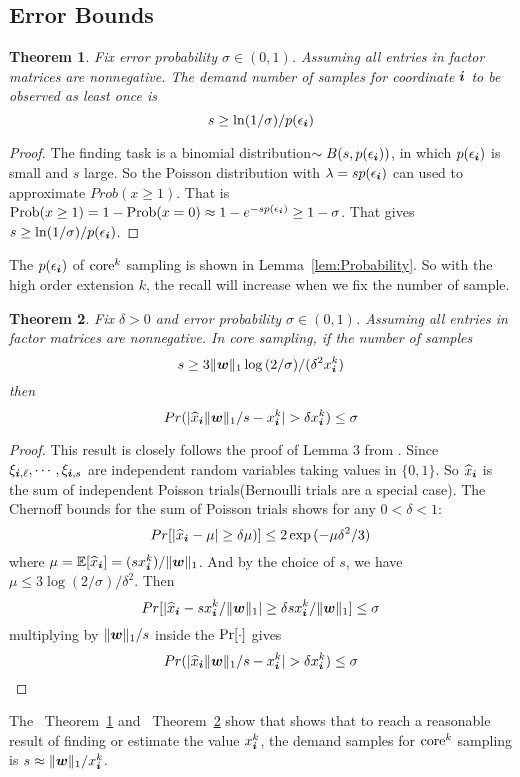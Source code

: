 \documentclass[letterpaper]{article}
\newcommand{\score}[1]{\xi_{\V{i},#1}}
\newcommand{\V}[1]{{\bm{{\MakeLowercase{#1}}}}}
\newcommand{\norm}[2]{\|#1\|_{#2}}
\newcommand{\Lem}[1]  {Lemma~\ref{lem:#1}}
\newcommand{\Theo}[1] {Theorem~\ref{theo:#1}}
\newcommand{\predx}{\widehat{x}_{\V{i}}}
\newtheorem{theorem}{Theorem}
\begin{document}
\subsection{Error Bounds}
\begin{theorem}\label{theo:ObservationBound}
Fix error probability $\sigma \in (0,1)$.
Assuming all entries in factor matrices are nonnegative.
The demand number of samples for coordinate $\V{i}$ to be observed as least once is
\[
    s \geq \ln(1/\sigma)/p(\epsilon_{\V{i}})
\]
\end{theorem}
\begin{proof}
The finding task is a binomial distribution$\sim B(s,p(\epsilon_{\V{i}}))$,
in which $p(\epsilon_{\V{i}})$ is small and $s$ large.
So the Poisson distribution with $\lambda = sp(\epsilon_{\V{i}})$
can used to approximate $Prob(x\geq1)$.
That is ${\rm Prob}(x\geq1) = 1-{\rm Prob}(x=0)\approx 1-e^{-sp(\epsilon_{\V{i}})} \geq 1-\sigma$.
That gives $s \geq \ln(1/\sigma)/p(\epsilon_{\V{i}})$.
\end{proof}
The $p(\epsilon_{\V{i}})$ of ${\rm core}^k$ sampling is shown in \Lem{Probability}.
So with the high order extension $k$, the recall will increase when we fix the number of sample.
\begin{theorem}\label{theo:Bound}
Fix $\delta > 0$ and error probability $\sigma \in (0,1)$.
Assuming all entries in factor matrices are nonnegative.
In core sampling, if the number of samples
\[
    s \geq 3\norm{\V{w}}{1}\log{(2/\sigma)}/(\delta^2 x^k_{\V{i}})
\]
then
\[
    Pr(|\predx\norm{\V{W}}{1}/s - x^k_{\V{i}}| > \delta x^k_{\V{i}}) \leq \sigma
\]
\end{theorem}

\begin{proof}
This result is closely follows the proof of Lemma 3 from \cite{BaPiKoSe15}.
Since  $ \score{\ell},\cdots,\score{s} $
are independent random variables taking values in $\{0,1\}$.
So $\predx$ is the sum of independent Poisson trials(Bernoulli trials are a special case).
The Chernoff bounds for the sum of Poisson trials shows for any $0 <\delta <1 $:
\[
    Pr[|\predx - \mu|\geq\delta\mu)] \leq 2\exp{(-\mu\delta^2/3)}
\]
where $\mu=\mathbb{E}[\predx]=(sx^k_{\V{i}})/\norm{\V{W}}{1}$.
And by the choice of $s$, we have
$\mu\leq 3\log{(2/\sigma)/\delta^2}$.
Then
\[
    Pr[|\predx-sx^k_{\V{i}}/\norm{\V{W}}{1}|\geq\delta sx^k_{\V{i}}/\norm{\V{W}}{1}] \leq \sigma
\]
multiplying by $\norm{\V{W}}{1}/s$ inside the ${\rm Pr}[\cdot]$ gives
\[
    Pr(|\predx\norm{\V{W}}{1}/s - x^k_{\V{i}}| > \delta x^k_{\V{i}}) \leq \sigma
\]
\end{proof}
The ~\Theo{ObservationBound} and ~\Theo{Bound} show that shows that
to reach a reasonable result of finding or estimate the value $x^k_{\V{i}}$,
the demand samples for ${\rm core}^k$ sampling is $s\approx \norm{\V{w}}{1}/x_{\V{i}}^k$.
\end{document}
